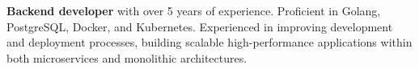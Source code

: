 \textbf{Backend developer} with over 5 years of experience. 
Proficient in Golang, PostgreSQL, Docker, and Kubernetes. 
Experienced in improving development and deployment processes, 
building scalable high-performance applications within both microservices 
and monolithic architectures.

